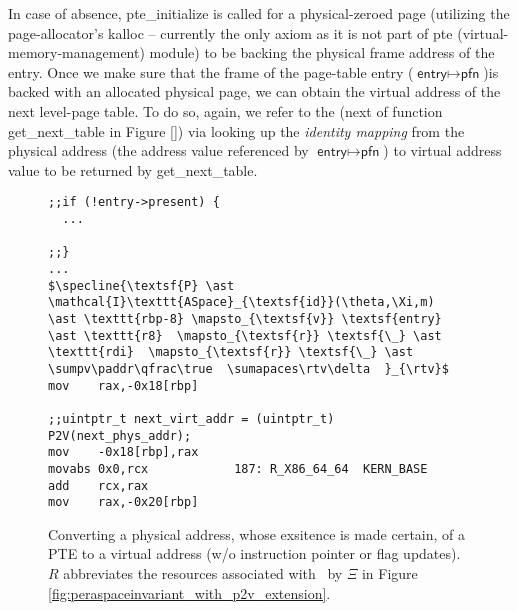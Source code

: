 In case of absence, \textsf{pte\_initialize} is called for a physical-zeroed page (utilizing the page-allocator's \textsf{kalloc} -- currently the only axiom as it is not part of \textsf{pte} (virtual-memory-management) module) to be backing the physical frame address of the entry.
Once we make sure that the frame of the page-table entry ($\textsf{entry}\mapsto\textsf{pfn}$)is backed with an allocated physical page, we can obtain the virtual address of the next level-page table. To do so, again, we refer to the  (\textsf{next} of function \textsf{get\_next\_table} in Figure \ref{}) via looking up the \textit{identity mapping} from the physical address (the address value referenced by $\textsf{entry}\mapsto\textsf{pfn}$) to virtual address value to be returned by \textsf{get\_next\_table}.
\begin{figure}\footnotesize
\begin{lstlisting}[mathescape]
;;if (!entry->present) {
  ...

;;}
...
$\specline{\textsf{P} \ast \mathcal{I}\texttt{ASpace}_{\textsf{id}}(\theta,\Xi,m)  \ast \texttt{rbp-8} \mapsto_{\textsf{v}} \textsf{entry} \ast \texttt{r8}  \mapsto_{\textsf{r}} \textsf{\_} \ast \texttt{rdi}  \mapsto_{\textsf{r}} \textsf{\_} \ast \sumpv\paddr\qfrac\true  \sumapaces\rtv\delta  }_{\rtv}$ 
mov    rax,-0x18[rbp]
  
;;uintptr_t next_virt_addr = (uintptr_t) P2V(next_phys_addr);
mov    -0x18[rbp],rax
movabs 0x0,rcx            187: R_X86_64_64	KERN_BASE
add    rcx,rax
mov    rax,-0x20[rbp]
\end{lstlisting}
\vspace{-1em}
\caption{Converting a physical address, whose exsitence is made certain, of a PTE to a virtual address (w/o instruction pointer or flag updates). $R$ abbreviates the resources
associated with \paddr\ by $\Xi$ in Figure \ref{fig:peraspaceinvariant_with_p2v_extension}.}
\label{fig:p2v}
\end{figure}



